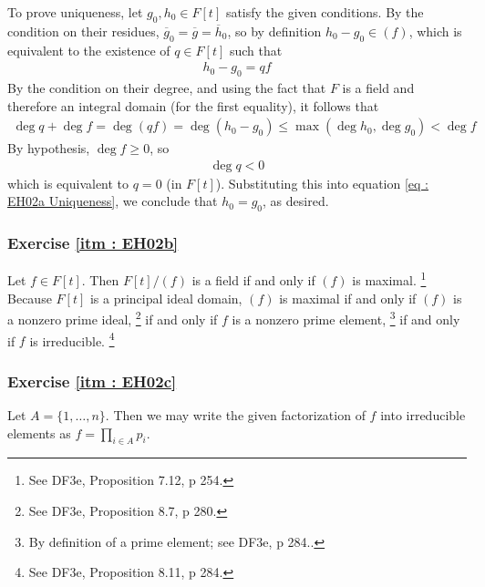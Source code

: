 \documentclass[oneside, english, 11pt]{article}
\begin{document}
To prove uniqueness, let $g_{0}, h_{0} \in F[t]$ satisfy the given conditions. By the condition on their residues, $\overline{g}_{0} = \overline{g} = \overline{h}_{0}$, so by definition $h_{0} - g_{0} \in (f)$, which is equivalent to the existence of $q \in F[t]$ such that
\begin{align}
h_{0} - g_{0}
=
q f%
\label{eq : EH02a Uniqueness}
\end{align}
By the condition on their degree, and using the fact that $F$ is a field and therefore an integral domain (for the first equality), it follows that
\begin{align*}
\deg q + \deg f
=
\deg(q f)
=
\deg(h_{0} - g_{0})
\leq
\max(\deg h_{0}, \deg g_{0})
<
\deg f
\end{align*}
By hypothesis, $\deg f \geq 0$, so
\begin{align*}
\deg q
<
0
\end{align*}
which is equivalent to $q = 0$ (in $F[t]$). Substituting this into equation \eqref{eq : EH02a Uniqueness}, we conclude that $h_{0} = g_{0}$, as desired.



\subsubsection*{Exercise \ref{itm : EH02b}}

Let $f \in F[t]$. Then $F[t] / (f)$ is a field if and only if $(f)$ is maximal.%
\footnote{See DF3e, Proposition 7.12, p 254.} %
Because $F[t]$ is a principal ideal domain, $(f)$ is maximal if and only if $(f)$ is a nonzero prime ideal,%
\footnote{See DF3e, Proposition 8.7, p 280.} %
if and only if $f$ is a nonzero prime element,%
\footnote{By definition of a prime element; see DF3e, p 284..} %
if and only if $f$ is irreducible.%
\footnote{See DF3e, Proposition 8.11, p 284.}%



\subsubsection*{Exercise \ref{itm : EH02c}}

Let $A = \{1, \ldots, n\}$. Then we may write the given factorization of $f$ into irreducible elements as $f = \prod_{i \in A} p_{i}$.
\end{document}
